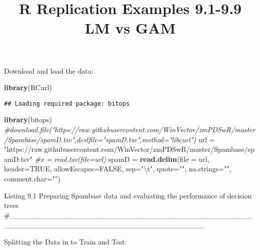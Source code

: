 \documentclass[]{article}
\title{R Replication Examples 9.1-9.9 LM vs GAM}
\author{}
\date{}
\newenvironment{Shaded}{\begin{snugshade}}{\end{snugshade}}
\newcommand{\CharTok}[1]{\textcolor[rgb]{0.31,0.60,0.02}{#1}}
\newcommand{\CommentTok}[1]{\textcolor[rgb]{0.56,0.35,0.01}{\textit{#1}}}
\newcommand{\DataTypeTok}[1]{\textcolor[rgb]{0.13,0.29,0.53}{#1}}
\newcommand{\DecValTok}[1]{\textcolor[rgb]{0.00,0.00,0.81}{#1}}
\newcommand{\KeywordTok}[1]{\textcolor[rgb]{0.13,0.29,0.53}{\textbf{#1}}}
\newcommand{\NormalTok}[1]{#1}
\newcommand{\OperatorTok}[1]{\textcolor[rgb]{0.81,0.36,0.00}{\textbf{#1}}}
\newcommand{\OtherTok}[1]{\textcolor[rgb]{0.56,0.35,0.01}{#1}}
\newcommand{\StringTok}[1]{\textcolor[rgb]{0.31,0.60,0.02}{#1}}
\begin{document}
\maketitle

Download and load the data:

\begin{Shaded}
\begin{Highlighting}[]
\KeywordTok{library}\NormalTok{(RCurl)}
\end{Highlighting}
\end{Shaded}

\begin{verbatim}
## Loading required package: bitops
\end{verbatim}

\begin{Shaded}
\begin{Highlighting}[]
\KeywordTok{library}\NormalTok{(bitops)}
\CommentTok{#download.file("https://raw.githubusercontent.com/WinVector/zmPDSwR/master/Spambase/spamD.tsv",destfile="spamD.tsv",method="libcurl")}
\NormalTok{url =}\StringTok{ "https://raw.githubusercontent.com/WinVector/zmPDSwR/master/Spambase/spamD.tsv"}
\CommentTok{#x = read.tsv(file=url)}
\NormalTok{spamD =}\StringTok{ }\KeywordTok{read.delim}\NormalTok{(}\DataTypeTok{file =}\NormalTok{ url, }\DataTypeTok{header=}\OtherTok{TRUE}\NormalTok{, }\DataTypeTok{allowEscapes=}\OtherTok{FALSE}\NormalTok{, }\DataTypeTok{sep=}\StringTok{"}\CharTok{\textbackslash{}t}\StringTok{"}\NormalTok{,  }\DataTypeTok{quote=}\StringTok{""}\NormalTok{, }\DataTypeTok{na.strings=}\StringTok{""}\NormalTok{, }\DataTypeTok{comment.char=}\StringTok{""}\NormalTok{)}
\end{Highlighting}
\end{Shaded}

Listing 9.1 Preparing Spambase data and evaluating the performance of
decision trees
\#\_\_\_\_\_\_\_\_\_\_\_\_\_\_\_\_\_\_\_\_\_\_\_\_\_\_\_\_\_\_\_\_\_\_\_\_\_\_\_\_\_\_\_\_\_\_\_\_\_\_\_\_\_\_\_\_\_\_\_\_\_\_\_\_\_\_\_\_\_\_\_\_\_\_\_\_\_\_\_\_\_\_\_\_

Splitting the Data in to Train and Test:

\begin{Shaded}
\end{Shaded}
\end{document}
